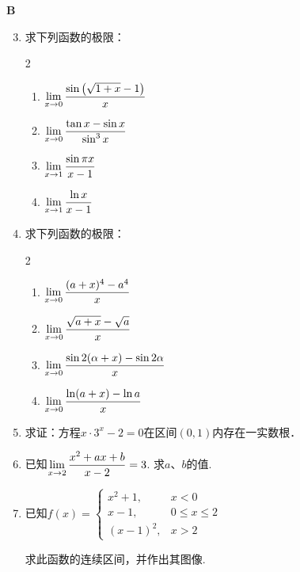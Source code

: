\begin{center}
    \bfseries B
\end{center}

\begin{enumerate}\setcounter{enumi}{2}

\item 求下列函数的极限：
\begin{multicols}{2}
\begin{enumerate}[(1)]
\item $\lim\limits_{x\to 0} \dfrac{\sin\left(\sqrt{1+x}-1\right)}{x}$
\item $\lim\limits_{x\to 0} \dfrac{\tan x-\sin x}{\sin^3 x}$
\item $\lim\limits_{x\to 1} \dfrac{\sin \pi x}{x-1}$
\item $\lim\limits_{x\to 1} \dfrac{\ln x}{x-1}$
\end{enumerate}
\end{multicols}


\item 求下列函数的极限：
\begin{multicols}{2}
\begin{enumerate}[(1)]
    \item $\lim\limits_{x\to 0} \dfrac{(a+x)^4-a^4}{x}$
    \item $\lim\limits_{x\to 0} \dfrac{\sqrt{a+x}-\sqrt{a}}{x}$
    \item $\lim\limits_{x\to 0} \dfrac{\sin 2(\alpha+x)-\sin 2\alpha}{x}$
    \item $\lim\limits_{x\to 0} \dfrac{\ln(a+x)-\ln a}{x}$
\end{enumerate}
\end{multicols}

\item 求证：方程$x\cdot 3^x-2=0$在区间$(0,1)$内存在一实数根．
\item 已知$\lim\limits_{x\to 2} \dfrac{x^2+ax+b}{x-2}=3$. 求$a$、$b$的值.
\item 已知$f(x)=\begin{cases}
    x^2+1, & x<0\\
    x-1,& 0\le x\le 2\\
    (x-1)^2, & x>2
\end{cases}$

求此函数的连续区间，并作出其图像.








\end{enumerate}
